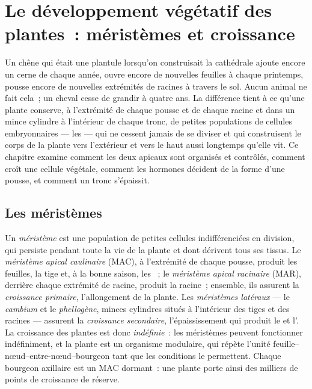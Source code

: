 \chapter{Le développement végétatif des plantes~: méristèmes et croissance}\label{ch:b2:plant-meristems}

Un chêne qui était une plantule lorsqu'on construisait la cathédrale
ajoute encore un cerne de  chaque année, ouvre encore de nouvelles
feuilles à chaque printemps, pousse encore de nouvelles extrémités de
racines à travers le sol. Aucun animal ne fait cela~; un cheval cesse de
grandir à quatre ans. La différence tient à ce qu'une plante conserve, à
l'extrémité de chaque pousse et de chaque racine et dans un mince
cylindre à l'intérieur de chaque tronc, de petites populations de
cellules embryonnaires --- les \emph{} --- qui ne cessent
jamais de se diviser et qui construisent le corps de la plante vers
l'extérieur et vers le haut aussi longtemps qu'elle vit. Ce chapitre
examine comment les deux  apicaux sont organisés et contrôlés,
comment croît une cellule végétale, comment les hormones décident de la
forme d'une pousse, et comment un tronc s'épaissit.

\section{Les méristèmes}

\begin{definition}\label{def:b2:plant-meristems:meristem}
Un \emph{méristème} est une population de petites cellules
indifférenciées en division, qui persiste pendant toute la vie de la
plante et dont dérivent tous ses tissus. Le \emph{méristème apical
caulinaire} (MAC), à l'extrémité de chaque pousse, produit les
feuilles, la tige et, à la bonne saison, les ~; le \emph{méristème
apical racinaire} (MAR), derrière chaque extrémité de racine, produit
la racine~; ensemble, ils assurent la \emph{croissance primaire},
l'allongement de la plante. Les \emph{méristèmes latéraux} --- le
\emph{cambium} et le \emph{phellogène}, minces cylindres situés à
l'intérieur des tiges et des racines --- assurent la \emph{croissance
secondaire}, l'épaississement qui produit le  et l'. La
croissance des plantes est donc \emph{indéfinie}~: les méristèmes
peuvent fonctionner indéfiniment, et la plante est un organisme
modulaire, qui répète l'unité feuille--nœud--entre-nœud--bourgeon tant
que les conditions le permettent. Chaque bourgeon axillaire est un MAC
dormant~: une plante porte ainsi des milliers de points de croissance
de réserve.
\end{definition}

